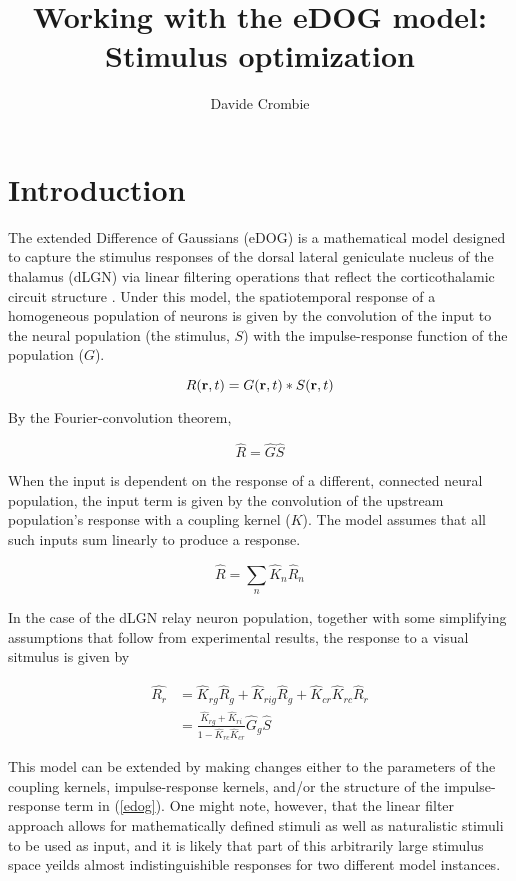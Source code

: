 \documentclass{article}
\title{Working with the eDOG model: Stimulus optimization}
\author{Davide Crombie}
\newcommand{\vect}[1]{\textbf{\textrm{#1}}}
\begin{document}
\maketitle

\section{Introduction} \label{introduction}
The extended Difference of Gaussians (eDOG) is a mathematical model designed to capture the stimulus responses of the dorsal lateral geniculate nucleus of the thalamus (dLGN) via linear filtering operations that reflect the corticothalamic circuit structure \citep{einevoll2012, mobarhan2018}.
Under this model, the spatiotemporal response of a homogeneous population of neurons is given by the convolution of the input to the neural population (the stimulus, $S$) with the impulse-response function of the population ($G$).

\begin{equation} \label{impulseresp}
	R(\vect{r},t) = G(\vect{r},t)*S(\vect{r},t)
\end{equation}

By the Fourier-convolution theorem,

\begin{equation*}
	\hat{R} = \hat{G}\hat{S}
\end{equation*}

When the input is dependent on the response of a different, connected neural population, the input term is given by the convolution of the upstream population's response with a coupling kernel ($K$). 
The  model assumes that all such inputs sum linearly to produce a response.

\begin{equation*}
	\hat{R} = \sum_n{\hat{K}_n\hat{R}_n}
\end{equation*}

In the case of the dLGN relay neuron population, together with some simplifying assumptions that follow from experimental results, the response to a visual sitmulus is given by

\begin{align} \label{edog}
	\hat{R_r} & = \hat{K}_{rg}\hat{R}_g + \hat{K}_{rig}\hat{R}_g + 
				  \hat{K}_{cr}\hat{K}_{rc}\hat{R}_r \nonumber \\
			  & = \frac{\hat{K}_{rg} + \hat{K}_{ri}}{1 - \hat{K}_{rc}\hat{K}_{cr}}\hat{G}_g\hat{S} 
\end{align}

This model can be extended by making changes either to the parameters of the coupling kernels, impulse-response kernels, and/or the structure of the impulse-response term in (\ref{edog}). 
One might note, however, that the linear filter approach allows for mathematically defined stimuli as well as naturalistic stimuli to be used as input, and it is likely that part of this arbitrarily large stimulus space yeilds almost indistinguishible responses for two different model instances.
\end{document}
